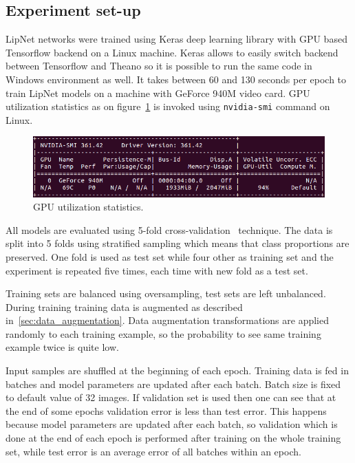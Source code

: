 \documentclass[a4paper, 11pt, table]{article}
\begin{document}
\subsection{Experiment set-up}

LipNet networks were trained using Keras deep learning library with GPU based Tensorflow backend on a Linux machine. Keras allows to easily switch backend between Tensorflow and Theano so it is possible to run the same code in Windows environment as well. It takes between 60 and 130 seconds per epoch to train LipNet models on a machine with GeForce 940M video card. GPU utilization statistics as on figure~\ref{fig:nvidia_smi} is invoked using \texttt{nvidia-smi} command on Linux.

\begin{figure}[H]
\centering
\includegraphics[scale=0.5]{nvidia_smi.png} 
\caption{GPU utilization statistics.}
\label{fig:nvidia_smi}
\end{figure}

All models are evaluated using 5-fold cross-validation~\cite{Kohavi:1995:SCB:1643031.1643047} technique. The data is split into 5 folds using stratified sampling which means that class proportions are preserved. One fold is used as test set while four other as training set and the experiment is repeated five times, each time with new fold as a test set.

Training sets are balanced using oversampling, test sets are left unbalanced. During training training data is augmented as described in~\ref{sec:data_augmentation}. Data augmentation transformations are applied randomly to each training example, so the probability to see same training example twice is quite low. 

Input samples are shuffled at the beginning of each epoch. Training data is fed in batches and model parameters are updated after each batch. Batch size is fixed to default value of 32 images. If validation set is used then one can see that at the end of some epochs validation error is less than test error. This happens because model parameters are updated after each batch, so validation which is done at the end of each epoch is performed after training on the whole training set, while test error is an average error of all batches within an epoch. 
\end{document}
